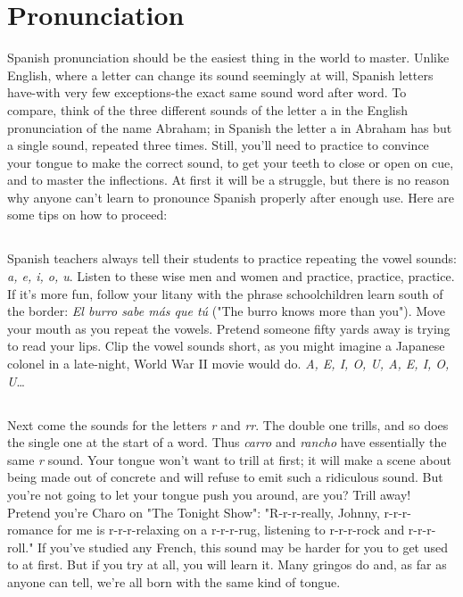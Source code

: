 \documentclass[14pt,a4paper,oneside]{memoir}
\begin{document}
\section{Pronunciation}

Spanish pronunciation should be the easiest thing in the world
to master. Unlike English, where a letter can change its sound seemingly at will, Spanish letters have-with very few exceptions-the exact same sound word after word. To compare, think of the three different sounds of the letter a in the English pronunciation of the name
Abraham; in Spanish the letter a in Abraham has but a single sound,
repeated three times. Still, you'll need to practice to convince your
tongue to make the correct sound, to get your teeth to close or open on
cue, and to master the inflections. At first it will be a struggle, but
there is no reason why anyone can't learn to pronounce Spanish properly after enough use. Here are some tips on how to proceed:

\subsection{}

Spanish teachers always tell their students to practice repeating the vowel sounds: \emph{a, e, i, o, u}. Listen to these wise men and
women and practice, practice, practice. If it's more fun, follow your
litany with the phrase schoolchildren learn south of the border: \emph{El burro sabe más que tú} ("The burro knows more than you"). Move your
mouth as you repeat the vowels. Pretend someone fifty yards away is
trying to read your lips. Clip the vowel sounds short, as you might
imagine a Japanese colonel in a late-night, World War II movie would
do. \emph{A, E, I, O, U, A, E, I, O, U}\ldots{}

\subsection{}

Next come the sounds for the letters \emph{r} and \emph{rr}. The double
one trills, and so does the single one at the start of a word. Thus \emph{carro}
and \emph{rancho} have essentially the same \emph{r} sound. Your tongue won't want
to trill at first; it will make a scene about being made out of concrete
and will refuse to emit such a ridiculous sound. But you're not going to
let your tongue push you around, are you? Trill away! Pretend you're
Charo on "The Tonight Show": "R-r-r-really, Johnny, r-r-r-romance for
me is r-r-r-relaxing on a r-r-r-rug, listening to r-r-r-rock and r-r-r-roll." If
you've studied any French, this sound may be harder for you to get
used to at first. But if you try at all, you will learn it. Many gringos do
and, as far as anyone can tell, we're all born with the same kind of
tongue.
\end{document}
